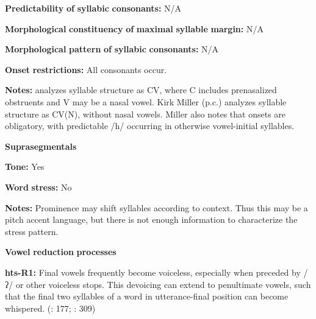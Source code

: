\begin{styleBody}
\textbf{Predictability} \textbf{of} \textbf{syllabic} \textbf{consonants:} N/A
\end{styleBody}

\begin{styleBody}
\textbf{Morphological} \textbf{constituency} \textbf{of} \textbf{maximal} \textbf{syllable} \textbf{margin:} N/A
\end{styleBody}

\begin{styleBody}
\textbf{Morphological} \textbf{pattern} \textbf{of} \textbf{syllabic} \textbf{consonants:} N/A
\end{styleBody}

\begin{styleBody}
\textbf{Onset} \textbf{restrictions:} All consonants occur.
\end{styleBody}

\begin{styleBody}
\textbf{Notes:} \citet{Sands2013} analyzes syllable structure as CV, where C includes prenasalized obstruents and V may be a nasal vowel. Kirk Miller (p.c.) analyzes syllable structure as CV(N), without nasal vowels. Miller also notes that onsets are obligatory, with predictable /h/ occurring in otherwise vowel-initial syllables.
\end{styleBody}

\begin{styleBody}
\textbf{Suprasegmentals}
\end{styleBody}

\begin{styleBody}
\textbf{Tone:} Yes
\end{styleBody}

\begin{styleBody}
\textbf{Word} \textbf{stress:} No
\end{styleBody}

\begin{styleBody}
\textbf{Notes:} Prominence may shift syllables according to context. Thus this may be a pitch accent language, but there is not enough information to characterize the stress pattern.
\end{styleBody}

\begin{styleBody}
\textbf{Vowel} \textbf{reduction} \textbf{processes}
\end{styleBody}

\begin{styleBody}
\textbf{hts-R1:} Final vowels frequently become voiceless, especially when preceded by /ʔ/ or other voiceless stops. This devoicing can extend to penultimate vowels, such that the final two syllables of a word in utterance-final position can become whispered. (\citealt{SandsEtAl1996}: 177; \citealt{TuckerEtAl1977}: 309)
\end{styleBody}


